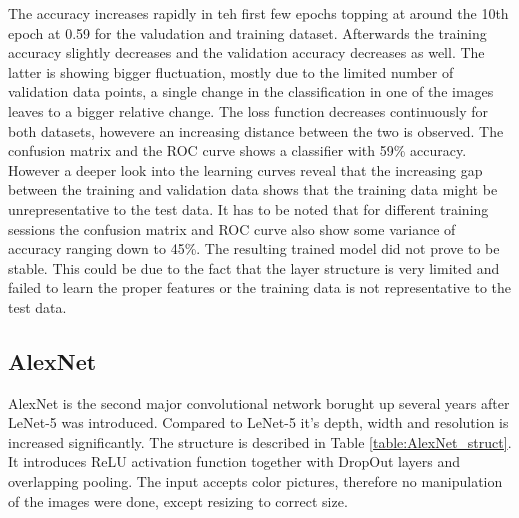 \documentclass[10pt, final]{article}
\begin{document}
The accuracy increases rapidly in teh first few epochs topping at around the 10th epoch at 0.59 for the valudation
and training dataset.
Afterwards the training accuracy slightly decreases and the validation accuracy decreases as well.
The latter is showing bigger fluctuation, mostly due to the limited number of validation data points, a single
change in the classification in one of the images leaves to a bigger relative change.
The loss function decreases continuously for both datasets, howevere an increasing distance between the two
is observed.
The confusion matrix and the ROC curve shows a classifier with 59\% accuracy.
However a deeper look into the learning curves reveal that the increasing gap between the training and validation
data shows that the training data might be unrepresentative to the test data.
It has to be noted that for different training sessions the confusion matrix and ROC curve also show some
variance of accuracy ranging down to 45\%.
The resulting trained model did not prove to be stable.
This could be due to the fact that the layer structure is very limited and failed to learn the proper features
or the training data is not representative to the test data.

\subsection{AlexNet} \label{sec:AlexNet}
AlexNet is the second major convolutional network borught up several years after LeNet-5 was introduced.
Compared to LeNet-5 it's depth, width and resolution is increased significantly.
The structure is described in Table \ref{table:AlexNet_struct}.
It introduces ReLU activation function together with DropOut layers and overlapping pooling.
The input accepts color pictures, therefore no manipulation of the images were done, except resizing to
correct size.
\end{document}

